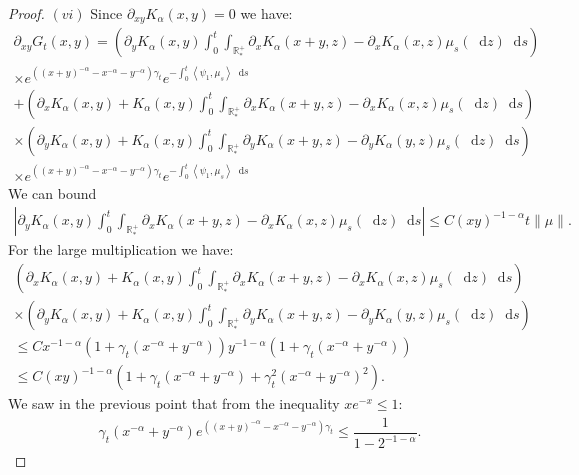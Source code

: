 \documentclass[11pt,a4paper]{article}
\newcommand{\RRP}{\mathbb{R}^+_*}
\newcommand{\brac}[1]{\left\langle#1\right\rangle}
\newcommand{\dd}{\mathop{}\!\mathrm{d}}
\begin{document}
\begin{proof}
    $(vi)$ Since $\partial_{xy}K_\alpha(x,y)= 0$ we have:
    \begin{multline*}
        \partial_{xy}G_t(x,y) = \left(\partial_y K_\alpha(x,y) \int_0^t \int_{\RRP} \partial_x K_\alpha(x+y,z) - \partial _x K_\alpha(x,z)\mu_s(\dd z)\dd s \right) \\
        \times e^{\left((x+y)^{-\alpha} - x^{-\alpha}- y^{-\alpha}\right)\gamma_t} e^{-\int_0^t \brac{\psi_1,\mu_s}\dd s} \\ 
        +\left(\partial_x K_\alpha(x,y) + K_\alpha(x,y) \int_0^t \int_{\RRP} \partial_x K_\alpha(x+y,z) - \partial _x K_\alpha(x,z)\mu_s(\dd z)\dd s\right) \\
        \times \left(\partial_y K_\alpha(x,y) + K_\alpha(x,y) \int_0^t \int_{\RRP} \partial_y K_\alpha(x+y,z) - \partial _y K_\alpha(y,z)\mu_s(\dd z)\dd s\right)\\
        \times e^{\left((x+y)^{-\alpha} - x^{-\alpha}- y^{-\alpha}\right)\gamma_t} e^{-\int_0^t \brac{\psi_1,\mu_s}\dd s}
    \end{multline*}
    We can bound
    \begin{align*}
        \left|\partial_y K_\alpha(x,y) \int_0^t \int_{\RRP} \partial_x K_\alpha(x+y,z) - \partial _x K_\alpha(x,z)\mu_s(\dd z)\dd s \right| \leq C(xy)^{-1-\alpha} t\|\mu\|.
    \end{align*}
    For the large multiplication we have:
    \begin{multline*}
        \left(\partial_x K_\alpha(x,y) + K_\alpha(x,y) \int_0^t \int_{\RRP} \partial_x K_\alpha(x+y,z) - \partial _x K_\alpha(x,z)\mu_s(\dd z)\dd s\right) \\
        \times \left(\partial_y K_\alpha(x,y) + K_\alpha(x,y) \int_0^t \int_{\RRP} \partial_y K_\alpha(x+y,z) - \partial _y K_\alpha(y,z)\mu_s(\dd z)\dd s\right) \\
        \leq C x^{-1-\alpha}\left(1 +  \gamma_t (x^{-\alpha} + y^{-\alpha})\right)y^{-1-\alpha} \left(1 +  \gamma_t(x^{-\alpha} + y^{-\alpha})\right)\\
        \leq C (xy)^{-1-\alpha}\left( 1 + \gamma_t (x^{-\alpha} + y^{-\alpha}) + \gamma_t^2  (x^{-\alpha} + y^{-\alpha})^2\right).
    \end{multline*}
    We saw in the previous point that from the inequality $xe^{-x} \leq 1$:
    \begin{align*}
        \gamma_t (x^{-\alpha} + y^{-\alpha}) e^{\left((x+y)^{-\alpha} - x^{-\alpha}- y^{-\alpha}\right)\gamma_t} \leq \dfrac{1}{1-2^{-1-\alpha}}.
    \end{align*}

\end{proof}
\end{document}
